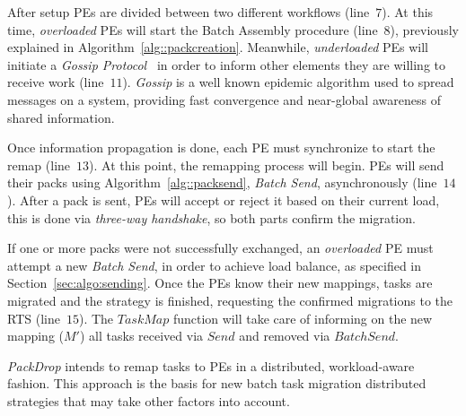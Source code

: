 After setup PEs are divided between two different workflows (line~$7$).
At this time, \textit{overloaded} PEs will start the Batch Assembly procedure (line~$8$), previously explained in Algorithm~\ref{alg::packcreation}.
Meanwhile, \textit{underloaded} PEs will initiate a \textit{Gossip Protocol}~\cite{gossip} in order to inform other elements they are willing to receive work (line~$11$).
\textit{Gossip} is a well known epidemic algorithm used to spread messages on a system, providing fast convergence and near-global awareness of shared information.

Once information propagation is done, each PE must synchronize to start the remap (line~$13$). 
At this point, the remapping process will begin.
PEs will send their packs using Algorithm~\ref{alg::packsend}, \textit{Batch Send}, asynchronously (line~$14$).
After a pack is sent, PEs will accept or reject it based on their current load, this is done via \textit{three-way handshake}, so both parts confirm the migration.

If one or more packs were not successfully exchanged, an \textit{overloaded} PE must attempt a new \textit{Batch Send}, in order to achieve load balance, as specified in Section~\ref{sec:algo:sending}.
Once the PEs know their new mappings, tasks are migrated and the strategy is finished, requesting the confirmed migrations to the RTS (line~$15$). 
The $TaskMap$ function will take care of informing on the new mapping ($M'$) all tasks received via $Send$ and removed via $BatchSend$.

\textit{PackDrop} intends to remap tasks to PEs in a distributed, workload-aware fashion.
This approach is the basis for new batch task migration distributed strategies that may take other factors into account.

